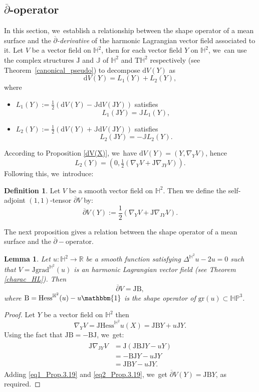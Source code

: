 \documentclass[JEP,XML,SOM,Unicode,NoEqCountersInSection, NoFloatCountersInSection,published]{cedram}
\theoremstyle{plain}
\newtheorem{lemma}[cor]{Lemma}
\theoremstyle{definition}
\newtheorem{defi}[cor]{Definition}
\newcommand{\HP}{\mathbb{HP}^3}
\newcommand{\grad}{\mathrm{grad}^{\mathbb{H}^2}}
\newcommand{\hess}{\mathrm{Hess}^{\mathbb{H}^2}}
\newcommand{\J}{\mathrm{J}}
\newcommand{\B}{\mathrm{B}}
\begin{document}
\subsection{\texorpdfstring{$\overline{\partial}$-operator}{dbar-operator}}\label{Sec_dbar_operator}
In this section, we~establish a relationship between the shape operator of a mean surface and the \emph{$\overline{\partial}$-derivative} of the harmonic Lagrangian vector field associated to it. Let $V$ be a vector field on $\mathbb{H}^2$, then for each vector field $Y$ on $\mathbb{H}^2$, we~can use the complex structures $\J$ and $\mathbb{J}$ of $\mathbb{H}^2$ and $\mathrm{T}\mathbb{H}^2$ respectively (see Theorem~\ref{canonical_pseudo}) to decompose $\mathrm{d}V(Y)$ as
\[
\mathrm{d}V(Y)=L_1(Y)+L_2(Y),
\]
where \begin{itemize}
\item $L_1(Y):=\frac{1}{2}(\mathrm{d}V(Y)-\mathbb{J}\mathrm{d}V(\J Y))$ satisfies
\[
L_1(\J Y)=\mathbb{J}L_1(Y),
\]
\item $L_2(Y):=\frac{1}{2}(\mathrm{d}V(Y)+\mathbb{J}\mathrm{d}V(\J Y))$ satisfies
\[
L_2(\J Y)=-\mathbb{J}L_2(Y).
\]
\end{itemize}
According to Proposition \ref{dV(X)}, we~have $\mathrm{d}V(Y)=(Y,\nabla_YV)$, hence
\[
L_2(Y)=(0,\tfrac{1}{2}(\nabla_YV+\J\nabla_{\J Y}V)).
\]
Following this, we~introduce:
\begin{defi}
Let $V$ be a smooth vector field on $\mathbb{H}^2$. Then we define the self-adjoint $(1,1)$-tensor $\overline{\partial}V$ by:
\begin{equation}\label{dbar_H2}
\overline{\partial}V(Y):=\frac{1}{2}(\nabla_YV+\J\nabla_{\J Y}V).
\end{equation}
\end{defi}
The next proposition gives a relation between the shape operator of a mean surface and the $\overline{\partial}-$operator.
\begin{lemma}\label{d_bar_and_shape_operator}
Let $u:\mathbb{H}^2\to\mathbb{R}$ be a smooth function satisfying $\Delta^{\mathbb{H}^2} u-2u=0$ such that $V=\J\grad(u)$ is an harmonic Lagrangian vector field (see Theorem
\ref{charac_HL}). Then
\[
\overline{\partial}V=\J\B,
\]
where $\B=\hess(u)-u\mathbbm{1}$ is the shape operator of $\mathrm{gr}(u)\subset\HP$.
\end{lemma}
\begin{proof}
Let $Y$ be a vector field on $\mathbb{H}^2$ then
\begin{equation}\label{eq1_Prop.3.19}
\nabla_YV=\J\hess u(X)=\J\B Y+u\J Y.
\end{equation}
Using the fact that $\J \B=-\B\J$, we~get:
\begin{align}\label{eq2_Prop.3.19}
\begin{split}
\J\nabla_{\J Y}V&=\J(\J \B \J Y-uY)\\
&=-\B \J Y-u\J Y\\
&=\J \B Y-u\J Y.
\end{split}
\end{align}
Adding \eqref{eq1_Prop.3.19} and \eqref{eq2_Prop.3.19}, we~get $ \overline{\partial}V(Y)=\J \B Y$, as required. \end{proof}
\end{document}
